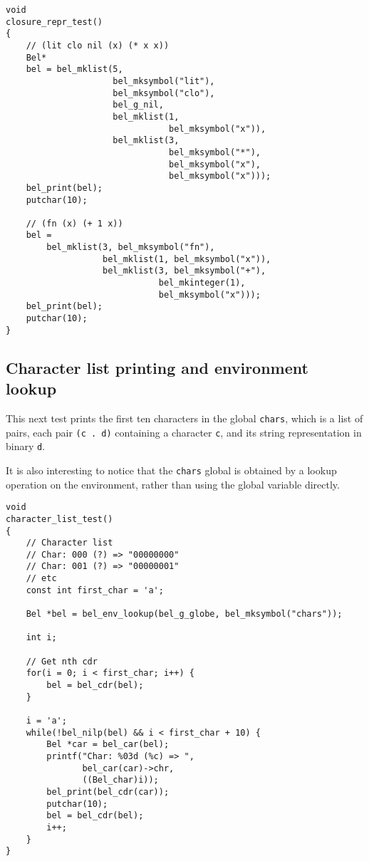 \documentclass[openright,a4paper,twoside,12pt]{memoir}
\begin{document}
\begin{verbatim}
void
closure_repr_test()
{
    // (lit clo nil (x) (* x x))
    Bel*
    bel = bel_mklist(5,
                     bel_mksymbol("lit"),
                     bel_mksymbol("clo"),
                     bel_g_nil,
                     bel_mklist(1,
                                bel_mksymbol("x")),
                     bel_mklist(3,
                                bel_mksymbol("*"),
                                bel_mksymbol("x"),
                                bel_mksymbol("x")));
    bel_print(bel);
    putchar(10);

    // (fn (x) (+ 1 x))
    bel =
        bel_mklist(3, bel_mksymbol("fn"),
                   bel_mklist(1, bel_mksymbol("x")),
                   bel_mklist(3, bel_mksymbol("+"),
                              bel_mkinteger(1),
                              bel_mksymbol("x")));
    bel_print(bel);
    putchar(10);     
}
\end{verbatim}

\subsection{Character list printing and environment lookup}
\label{sec:orgfe84f5e}

This next test prints the first ten characters in the global \texttt{chars},
which is a list of pairs, each pair \texttt{(c . d)} containing a character \texttt{c},
and its string representation in binary \texttt{d}.

It is also interesting to notice that the \texttt{chars} global is obtained by
a lookup operation on the environment, rather than using the global
variable directly.

\begin{verbatim}
void
character_list_test()
{
    // Character list
    // Char: 000 (?) => "00000000"
    // Char: 001 (?) => "00000001"
    // etc
    const int first_char = 'a';
    
    Bel *bel = bel_env_lookup(bel_g_globe, bel_mksymbol("chars"));
    
    int i;

    // Get nth cdr
    for(i = 0; i < first_char; i++) {
        bel = bel_cdr(bel);
    }

    i = 'a';
    while(!bel_nilp(bel) && i < first_char + 10) {
        Bel *car = bel_car(bel);
        printf("Char: %03d (%c) => ",
               bel_car(car)->chr,
               ((Bel_char)i));
        bel_print(bel_cdr(car));
        putchar(10);
        bel = bel_cdr(bel);
        i++;
    }
}
\end{verbatim}
\end{document}
